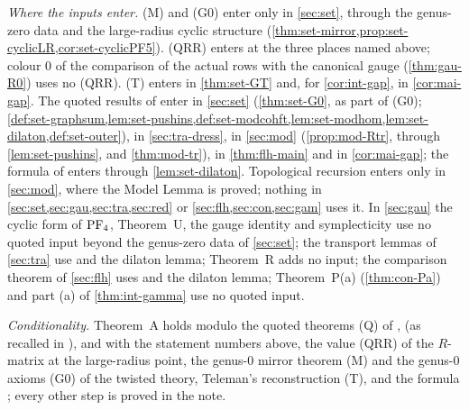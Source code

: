 \emph{Where the inputs enter.} (M) and (G0) enter only in \cref{sec:set}, through the genus-zero data and the large-radius cyclic structure (\cref{thm:set-mirror,prop:set-cyclicLR,cor:set-cyclicPF5}). (QRR) enters at the three places named above; colour $0$ of the comparison of the actual rows with the canonical gauge (\cref{thm:gau-R0}) uses no (QRR). (T) enters in \cref{thm:set-GT} and, for \cref{cor:int-gap}, in \cref{cor:mai-gap}. The quoted results of \cite{PPZ15} enter in \cref{sec:set} (\cref{thm:set-G0}, as part of (G0); \cref{def:set-graphsum,lem:set-pushins,def:set-modcohft,lem:set-modhom,lem:set-dilaton,def:set-outer}), in \cref{sec:tra-dress}, in \cref{sec:mod} (\cref{prop:mod-Rtr}, through \cref{lem:set-pushins}, and \cref{thm:mod-tr}), in \cref{thm:flh-main} and in \cref{cor:mai-gap}; the formula of \cite{AC96} enters through \cref{lem:set-dilaton}. Topological recursion enters only in \cref{sec:mod}, where the Model Lemma is proved; nothing in \cref{sec:set,sec:gau,sec:tra,sec:red} or \cref{sec:flh,sec:con,sec:gam} uses it. In \cref{sec:gau} the cyclic form of $\mathrm{PF}_{4}$, Theorem~U, the gauge identity and symplecticity use no quoted input beyond the genus-zero data of \cref{sec:set}; the transport lemmas of \cref{sec:tra} use \cite[Defs.~2.2, 2.13]{PPZ15} and the dilaton lemma; Theorem~R adds no input; the comparison theorem of \cref{sec:flh} uses \cite[Def.~0.3, Remark~2.1 and (6), Defs.~2.2, 2.5, 2.13, Prop.~2.12]{PPZ15} and the dilaton lemma; Theorem~P(a) (\cref{thm:con-Pa}) and part (a) of \cref{thm:int-gamma} use no quoted input.

\emph{Conditionality.} Theorem~A holds modulo the quoted theorems (Q) of \cite{Eynard:2007kz}, \cite{DuninBarkowski:2012bw} (as recalled in \cite{Dunin-Barkowski:2015caa}), \cite{ABDKS25} and \cite{PPZ15} with the statement numbers above, the value (QRR) of the $R$-matrix at the large-radius point, the genus-$0$ mirror theorem (M) and the genus-$0$ axioms (G0) of the twisted theory, Teleman's reconstruction (T), and the formula \cite[(1.7)]{AC96}; every other step is proved in the note.

